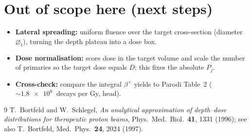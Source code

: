 \documentclass[11pt]{article}
\begin{document}
\section{Out of scope here (next steps)}

\begin{itemize}[nosep]
\item \textbf{Lateral spreading:} uniform fluence over the target cross-section
(diameter $\varnothing_{\mathrm t}$), turning the depth plateau into a dose box.
\item \textbf{Dose normalisation:} score dose in the target volume and scale the
number of primaries so the target dose equals $D$; this fixes the absolute $P_j$.
\item \textbf{Cross-check:} compare the integral $\beta^{+}$ yields to Parodi
Table~2 ($\sim\!\SI{1.8e8}{}$ decays per Gy, head).
\end{itemize}

\begin{thebibliography}{9}
 T.~Bortfeld and W.~Schlegel,
\emph{An analytical approximation of depth--dose distributions for therapeutic
proton beams}, Phys.\ Med.\ Biol.\ \textbf{41}, 1331 (1996); see also
T.~Bortfeld, Med.\ Phys.\ \textbf{24}, 2024 (1997).
\end{thebibliography}
\end{document}

